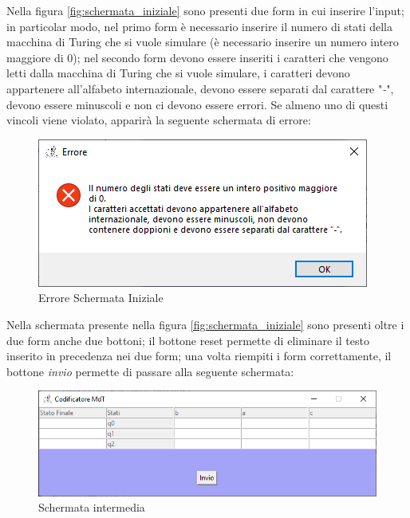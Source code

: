 \documentclass[a4paper,12pt,titlepage,oneside]{book}
\begin{document}
Nella figura \ref{fig:schermata_iniziale} sono presenti due \foreignlanguage{english}{form} in cui inserire l'input; in particolar modo, nel primo \foreignlanguage{english}{form} è necessario inserire il numero di stati della macchina di Turing che si vuole simulare (è necessario inserire un numero intero maggiore di 0); nel secondo form devono essere inseriti i caratteri che vengono letti dalla macchina di Turing che si vuole simulare, i caratteri devono appartenere all'alfabeto internazionale, devono essere separati dal carattere "\emph{-}", devono essere minuscoli e non ci devono essere errori. Se almeno uno di questi vincoli viene violato, apparirà la seguente schermata di errore:

\clearpage

 \begin{figure}[h!]
	\centering
	\includegraphics[width=.5\textwidth]{Images/errore_schermata_iniziale.png}
	\caption{Errore Schermata Iniziale}
	\label{fig:errore_schermata_iniziale}
\end{figure}


Nella schermata presente nella figura \ref{fig:schermata_iniziale} sono presenti oltre i due \foreignlanguage{english}{form} anche due bottoni; il bottone \foreignlanguage{english}{reset} permette di eliminare il testo inserito in precedenza nei due 	\foreignlanguage{english}{form}; una volta riempiti i \foreignlanguage{english}{form} correttamente, il bottone \emph{invio} permette di passare alla seguente schermata:

\begin{figure}[!htpb]
	\centering
	\includegraphics[width=.8\textwidth]{Images/schermata_intermedia.png}
	\caption{Schermata intermedia}
	\label{fig:schermata_intermedia}
\end{figure}
\end{document}
